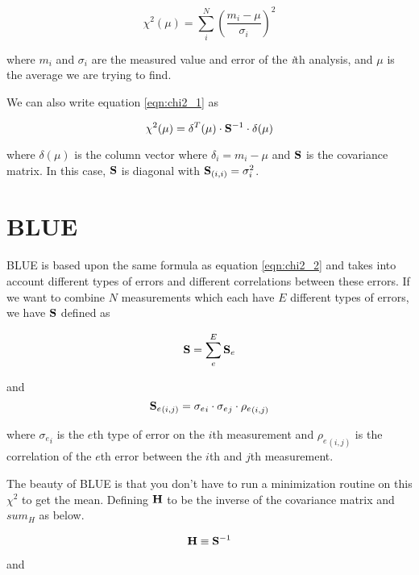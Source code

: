 \documentclass[12pt,twoside,letterpaper]{article}
\begin{document}
\begin{equation}
\label{eqn:chi2_1}
\chi^2(\mu) = \sum_i^N \left( \frac{ m_i - \mu } {\sigma_i} \right)^2
\end{equation}

where $m_i$ and $\sigma_i$ are the measured value and error of the
{\em i}th analysis, and $\mu$ is the average we are trying to find.


We can also write equation \ref{eqn:chi2_1} as

\begin{equation}
\label{eqn:chi2_2}
\chi^2(\mu) = {\bf \delta}^T(\mu) \cdot {\bf S}^{-1} \cdot {\bf \delta} (\mu)
\end{equation}

where $\delta(\mu)$ is the column vector where $\delta_i = m_i - \mu$
and ${\bf S}$ is the covariance matrix.  In this case, ${\bf S}$ is
diagonal with ${\bf S}_{(i,i)} = \sigma_i^2$.

\section {BLUE}

BLUE is based upon the same formula as equation \ref{eqn:chi2_2} and
takes into account different types of errors and different
correlations between these errors.  If we want to combine $N$
measurements which each have $E$ different types of errors, we have
${\bf S}$ defined as

\begin{equation}
{\bf S} = \sum_{e}^E {\bf S}_e
\end{equation}

and 
\begin{equation}
{{\bf S}_e}_{(i,j)} = {\sigma_e}_i \cdot {\sigma_e}_j 
\cdot {\rho_e}_{(i,j)}
\end{equation}

where ${\sigma_e}_i$ is the $e$th type of error on the $i$th
  measurement and ${\rho_e}_{(i,j)}$ is the correlation of the $e$th
  error between the $i$th and $j$th measurement.

The beauty of BLUE is that you don't have to run a minimization
routine on this $\chi^2$ to get the mean.  Defining ${\bf H}$ to be
the inverse of the covariance matrix and $sum_H$ as below.

\begin{equation}
{\bf H} \equiv {\bf S}^{-1}
\end{equation}

and 
\end{document}
